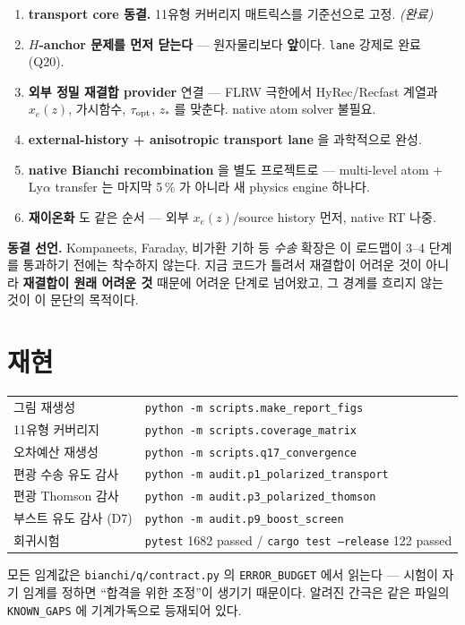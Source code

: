 \documentclass[11pt,a4paper]{article}
\begin{document}
\begin{enumerate}\itemsep2pt
\item \textbf{transport core 동결.} 11유형 커버리지 매트릭스를 기준선으로 고정. \emph{(완료)}
\item \textbf{$H$-anchor 문제를 먼저 닫는다} --- 원자물리보다 \textbf{앞}이다.
      \texttt{lane} 강제로 완료 (Q20).
\item \textbf{외부 정밀 재결합 provider} 연결 --- FLRW 극한에서 HyRec/Recfast 계열과
      $x_e(z)$, 가시함수, $\tau_{\rm opt}$, $z_*$ 를 맞춘다.  native atom solver 불필요.
\item \textbf{external-history + anisotropic transport lane} 을 과학적으로 완성.
\item \textbf{native Bianchi recombination} 을 별도 프로젝트로 --- multi-level atom
      + Ly$\alpha$ transfer 는 마지막 5\,\% 가 아니라 새 physics engine 하나다.
\item \textbf{재이온화} 도 같은 순서 --- 외부 $x_e(z)$/source history 먼저, native RT 나중.
\end{enumerate}

\noindent\textbf{동결 선언.} Kompaneets, Faraday, 비가환 기하 등 \emph{수송} 확장은
이 로드맵이 3--4 단계를 통과하기 전에는 착수하지 않는다.  지금 코드가 틀려서
재결합이 어려운 것이 아니라 \textbf{재결합이 원래 어려운 것} 때문에 어려운
단계로 넘어왔고, 그 경계를 흐리지 않는 것이 이 문단의 목적이다.

\section{재현}

\begin{center}\small
\begin{tabular}{@{}ll@{}}
\toprule
그림 재생성 & \texttt{python -m scripts.make\_report\_figs} \\
11유형 커버리지 & \texttt{python -m scripts.coverage\_matrix} \\
오차예산 재생성 & \texttt{python -m scripts.q17\_convergence} \\
편광 수송 유도 감사 & \texttt{python -m audit.p1\_polarized\_transport} \\
편광 Thomson 감사 & \texttt{python -m audit.p3\_polarized\_thomson} \\
부스트 유도 감사 (D7) & \texttt{python -m audit.p9\_boost\_screen} \\
회귀시험 & \texttt{pytest} 1682 passed / \texttt{cargo test --release} 122 passed \\
\bottomrule
\end{tabular}
\end{center}

\noindent 모든 임계값은 \texttt{bianchi/q/contract.py} 의 \texttt{ERROR\_BUDGET} 에서
읽는다 --- 시험이 자기 임계를 정하면 ``합격을 위한 조정''이 생기기 때문이다.
알려진 간극은 같은 파일의 \texttt{KNOWN\_GAPS} 에 기계가독으로 등재되어 있다.
\end{document}
